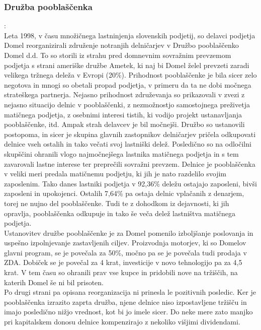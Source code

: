\documentclass[12pt,a4paper]{amsart}
\theoremstyle{definition} %
\theoremstyle{plain} %
\begin{document}
\subsubsection{Družba pooblaščenka}:\\
Leta 1998, v času množičnega lastninjenja slovenskih podjetij, so delavci podjetja Domel reorganizirali združenje notranjih delničarjev v Družbo pooblaščenko Domel d.d. To so storili iz strahu pred domnevnim sovražnim prevzemom podjetja s strani ameriške družbe Ametek, ki naj bi Domel želel prevzeti zaradi velikega tržnega deleža v Evropi (20\%). Prihodnost pooblaščenke je bila sicer zelo negotova in mnogi so obetali propad podjetja, v primeru da ta ne dobi močnega strateškega partnerja. Nejasno prihodnost združevanja so prikazovali v zvezi z nejasno situacijo delnic v pooblaščenki, z nezmožnostjo samostojnega preživetja matičnega podjetja, z osebnimi interesi tistih, ki vodijo projekt ustanavljanja pooblaščenke, itd. Ampak strah delavcev je bil močnejši. Družbo so ustanovili postopoma, in sicer je skupina glavnih zastopnikov delničarjev pričela odkupovati delnice vseh ostalih in tako večati svoj lastniški delež. Posledično so na odločilni skupščini ohranili vlogo najmočnejšega lastnika matičnega podjetja in s tem zavarovali lastne interese ter preprečili sovražni prevzem. Delnice je pooblaščenka v veliki meri predala matičnemu podjetju, ki jih je nato razdelilo svojim zaposlenim. Tako danes lastniki podjetja v 92,36\% deležu ostajajo zaposleni, bivši zaposleni in upokojenci. Ostalih 7,64\% pa ostaja delnic vplačanih z denarjem, torej ne nujno del pooblaščenke. Tudi te z dohodkom iz dejavnosti, ki jih opravlja, pooblaščenka odkupuje in tako še veča delež lastništva matičnega podjetja. \\
Ustanovitev družbe pooblaščenke je za Domel pomenilo izboljšanje poslovanja in uspešno izpolnjevanje zastavljenih ciljev. Proizvodnja motorjev, ki so Domelov glavni program, se je povečala za 50\%, močno pa se je povečala tudi prodaja v ZDA. Dobiček se je povečal za 4 krat, investicije v novo tehnologijo pa za 4,5 krat. V tem času so ohranili prav vse kupce in pridobili nove na tržiščih, na katerih Domel še ni bil prisoten.\\
Po drugi strani pa opisana reorganizacija ni prinesla le pozitivnih posledic. Ker je pooblaščenka izrazito zaprta družba, njene delnice niso izpostavljene tržišču in imajo posledično nižjo vrednost, kot bi jo imele sicer. Do neke mere zato manjko pri kapitalskem donosu delnice kompenzirajo z nekoliko višjimi dividendami.
\end{document}
